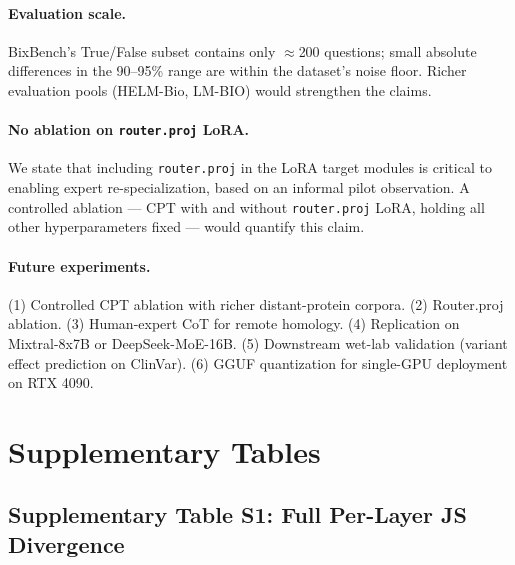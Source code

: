 \documentclass[11pt]{article}
\begin{document}
\paragraph{Evaluation scale.} BixBench's True/False subset contains only $\approx$200 questions; small absolute differences in the 90--95\% range are within the dataset's noise floor. Richer evaluation pools (HELM-Bio, LM-BIO) would strengthen the claims.

\paragraph{No ablation on \texttt{router.proj} LoRA.} We state that including \texttt{router.proj} in the LoRA target modules is critical to enabling expert re-specialization, based on an informal pilot observation. A controlled ablation --- CPT with and without \texttt{router.proj} LoRA, holding all other hyperparameters fixed --- would quantify this claim.

\paragraph{Future experiments.} (1) Controlled CPT ablation with richer distant-protein corpora. (2) Router.proj ablation. (3) Human-expert CoT for remote homology. (4) Replication on Mixtral-8x7B or DeepSeek-MoE-16B. (5) Downstream wet-lab validation (variant effect prediction on ClinVar). (6) GGUF quantization for single-GPU deployment on RTX 4090.

\section{Supplementary Tables}

\subsection{Supplementary Table S1: Full Per-Layer JS Divergence}
\end{document}
